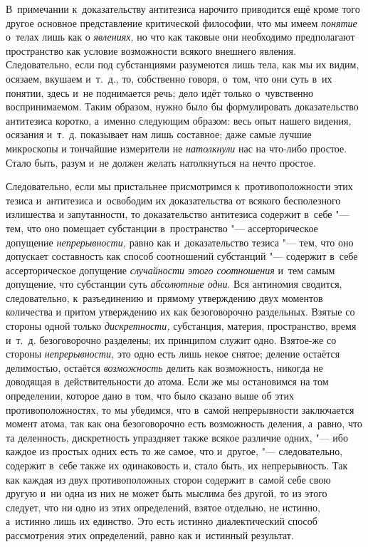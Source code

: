 В~примечании к~доказательству антитезиса нарочито приводится ещё кроме того
другое основное представление критической философии, что мы имеем {\em понятие}
о~телах лишь как о {\em явлениях,} но что как таковые они необходимо
предполагают пространство как условие возможности всякого внешнего явления.
Следовательно, если под субстанциями разумеются лишь тела, как мы их видим,
осязаем, вкушаем и~т.~д., то, собственно говоря, о~том, что они суть в~их
понятии, здесь и~не поднимается речь; дело идёт только о~чувственно
воспринимаемом. Таким образом, нужно было бы формулировать доказательство
антитезиса коротко, а~именно следующим образом: весь опыт нашего видения,
осязания и~т.~д. показывает нам лишь составное; даже самые лучшие микроскопы и
тончайшие измерители не {\em натолкнули} нас на что-либо простое. Стало быть,
разум и~не должен желать натолкнуться на нечто простое.

Следовательно, если мы пристальнее присмотримся к~противоположности этих тезиса
и~антитезиса и~освободим их доказательства от всякого бесполезного излишества и
запутанности, то доказательство антитезиса содержит в~себе "--- тем, что оно
помещает субстанции в~пространство "--- ассерторическое допущение
{\em непрерывности,} равно как и~доказательство тезиса "--- тем, что оно
допускает составность как способ соотношений субстанций "--- содержит в~себе
ассерторическое допущение {\em случайности этого соотношения} и~тем самым
допущение, что субстанции суть {\em абсолютные одни}. Вся антиномия сводится,
следовательно, к~разъединению и~прямому утверждению двух моментов количества и
притом утверждению их как безоговорочно раздельных. Взятые со стороны одной
только {\em дискретности,} субстанция, материя, пространство, время и~т.~д.
безоговорочно разделены; их принципом служит одно. Взятое-же со стороны
{\em непрерывности,} это одно есть лишь некое снятое; деление остаётся
делимостью, остаётся {\em возможность} делить как возможность, никогда не
доводящая в~действительности до атома. Если же мы остановимся на том
определении, которое дано в~том, что было сказано выше об этих
противоположностях, то мы убедимся, что в~самой непрерывности заключается
момент атома, так как она безоговорочно есть возможность деления, а~равно, что
та деленность, дискретность упраздняет также всякое различие одних, "--- ибо
каждое из простых одних есть то же самое, что и~другое, "--- следовательно,
содержит в~себе также их одинаковость и, стало быть, их непрерывность. Так как
каждая из двух противоположных сторон содержит в~самой себе свою другую и~ни
одна из них не может быть мыслима без другой, то из этого следует, что ни одно
из этих определений, взятое отдельно, не истинно, а~истинно лишь их единство.
Это есть истинно диалектический способ рассмотрения этих определений, равно как
и~истинный результат.

